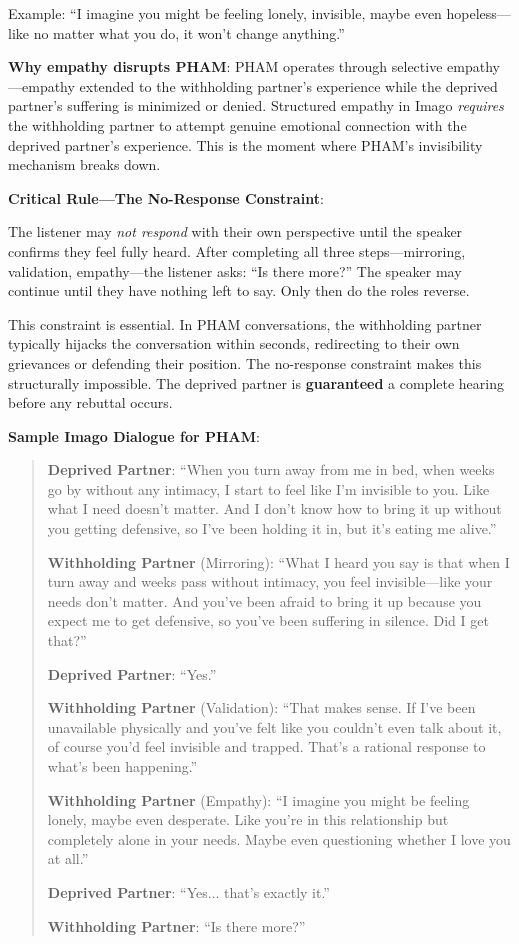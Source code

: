 \documentclass[12pt, letterpaper]{article}
\begin{document}
Example: ``I imagine you might be feeling lonely, invisible, maybe even hopeless---like no matter what you do, it won't change anything.''

\textbf{Why empathy disrupts PHAM}: PHAM operates through selective empathy---empathy extended to the withholding partner's experience while the deprived partner's suffering is minimized or denied. Structured empathy in Imago \textit{requires} the withholding partner to attempt genuine emotional connection with the deprived partner's experience. This is the moment where PHAM's invisibility mechanism breaks down.

\textbf{Critical Rule---The No-Response Constraint}:

The listener may \textit{not respond} with their own perspective until the speaker confirms they feel fully heard. After completing all three steps---mirroring, validation, empathy---the listener asks: ``Is there more?'' The speaker may continue until they have nothing left to say. Only then do the roles reverse.

This constraint is essential. In PHAM conversations, the withholding partner typically hijacks the conversation within seconds, redirecting to their own grievances or defending their position. The no-response constraint makes this structurally impossible. The deprived partner is \textbf{guaranteed} a complete hearing before any rebuttal occurs.

\textbf{Sample Imago Dialogue for PHAM}:

\begin{quote}
\textbf{Deprived Partner}: ``When you turn away from me in bed, when weeks go by without any intimacy, I start to feel like I'm invisible to you. Like what I need doesn't matter. And I don't know how to bring it up without you getting defensive, so I've been holding it in, but it's eating me alive.''

\textbf{Withholding Partner} (Mirroring): ``What I heard you say is that when I turn away and weeks pass without intimacy, you feel invisible---like your needs don't matter. And you've been afraid to bring it up because you expect me to get defensive, so you've been suffering in silence. Did I get that?''

\textbf{Deprived Partner}: ``Yes.''

\textbf{Withholding Partner} (Validation): ``That makes sense. If I've been unavailable physically and you've felt like you couldn't even talk about it, of course you'd feel invisible and trapped. That's a rational response to what's been happening.''

\textbf{Withholding Partner} (Empathy): ``I imagine you might be feeling lonely, maybe even desperate. Like you're in this relationship but completely alone in your needs. Maybe even questioning whether I love you at all.''

\textbf{Deprived Partner}: ``Yes... that's exactly it.''

\textbf{Withholding Partner}: ``Is there more?''
\end{quote}
\end{document}
